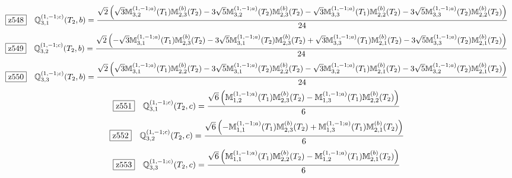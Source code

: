 \documentclass[fleqn,10pt,landscape]{jsarticle}
\begin{document}
\begin{dmath*}
\hspace*{3mm}\fbox{z548}\quad \mathbb{Q}_{3,1}^{(1,-1;c)}(T_{2},b)=\frac{\sqrt{2} \left(\sqrt{3} \mathbb{M}_{3,2}^{(1,-1;a)}(T_{1}) \mathbb{M}_{2,3}^{(b)}(T_{2}) - 3 \sqrt{5} \mathbb{M}_{3,2}^{(1,-1;a)}(T_{2}) \mathbb{M}_{2,3}^{(b)}(T_{2}) - \sqrt{3} \mathbb{M}_{3,3}^{(1,-1;a)}(T_{1}) \mathbb{M}_{2,2}^{(b)}(T_{2}) - 3 \sqrt{5} \mathbb{M}_{3,3}^{(1,-1;a)}(T_{2}) \mathbb{M}_{2,2}^{(b)}(T_{2})\right)}{24}
\end{dmath*}
\begin{dmath*}
\hspace*{3mm}\fbox{z549}\quad \mathbb{Q}_{3,2}^{(1,-1;c)}(T_{2},b)=\frac{\sqrt{2} \left(- \sqrt{3} \mathbb{M}_{3,1}^{(1,-1;a)}(T_{1}) \mathbb{M}_{2,3}^{(b)}(T_{2}) - 3 \sqrt{5} \mathbb{M}_{3,1}^{(1,-1;a)}(T_{2}) \mathbb{M}_{2,3}^{(b)}(T_{2}) + \sqrt{3} \mathbb{M}_{3,3}^{(1,-1;a)}(T_{1}) \mathbb{M}_{2,1}^{(b)}(T_{2}) - 3 \sqrt{5} \mathbb{M}_{3,3}^{(1,-1;a)}(T_{2}) \mathbb{M}_{2,1}^{(b)}(T_{2})\right)}{24}
\end{dmath*}
\begin{dmath*}
\hspace*{3mm}\fbox{z550}\quad \mathbb{Q}_{3,3}^{(1,-1;c)}(T_{2},b)=\frac{\sqrt{2} \left(\sqrt{3} \mathbb{M}_{3,1}^{(1,-1;a)}(T_{1}) \mathbb{M}_{2,2}^{(b)}(T_{2}) - 3 \sqrt{5} \mathbb{M}_{3,1}^{(1,-1;a)}(T_{2}) \mathbb{M}_{2,2}^{(b)}(T_{2}) - \sqrt{3} \mathbb{M}_{3,2}^{(1,-1;a)}(T_{1}) \mathbb{M}_{2,1}^{(b)}(T_{2}) - 3 \sqrt{5} \mathbb{M}_{3,2}^{(1,-1;a)}(T_{2}) \mathbb{M}_{2,1}^{(b)}(T_{2})\right)}{24}
\end{dmath*}
\begin{dmath*}
\hspace*{3mm}\fbox{z551}\quad \mathbb{Q}_{3,1}^{(1,-1;c)}(T_{2},c)=\frac{\sqrt{6} \left(\mathbb{M}_{1,2}^{(1,-1;a)}(T_{1}) \mathbb{M}_{2,3}^{(b)}(T_{2}) - \mathbb{M}_{1,3}^{(1,-1;a)}(T_{1}) \mathbb{M}_{2,2}^{(b)}(T_{2})\right)}{6}
\end{dmath*}
\begin{dmath*}
\hspace*{3mm}\fbox{z552}\quad \mathbb{Q}_{3,2}^{(1,-1;c)}(T_{2},c)=\frac{\sqrt{6} \left(- \mathbb{M}_{1,1}^{(1,-1;a)}(T_{1}) \mathbb{M}_{2,3}^{(b)}(T_{2}) + \mathbb{M}_{1,3}^{(1,-1;a)}(T_{1}) \mathbb{M}_{2,1}^{(b)}(T_{2})\right)}{6}
\end{dmath*}
\begin{dmath*}
\hspace*{3mm}\fbox{z553}\quad \mathbb{Q}_{3,3}^{(1,-1;c)}(T_{2},c)=\frac{\sqrt{6} \left(\mathbb{M}_{1,1}^{(1,-1;a)}(T_{1}) \mathbb{M}_{2,2}^{(b)}(T_{2}) - \mathbb{M}_{1,2}^{(1,-1;a)}(T_{1}) \mathbb{M}_{2,1}^{(b)}(T_{2})\right)}{6}
\end{dmath*}
\end{document}
